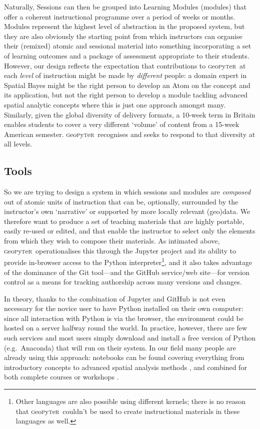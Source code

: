 \documentclass[letter, 11pt,titlepage]{article}
\newcommand{\gp}{\textsc{g}eo\textsc{p}y\textsc{t}e\textsc{r}~\/}
\newcommand{\eg}{e.g.~\/}
\begin{document}
Naturally, Sessions can then be grouped into Learning Modules (modules) that offer a coherent instructional programme over a period of weeks or months. Modules represent the highest level of abstraction in the proposed system, but they are also obviously the starting point from which instructors can organise their (remixed) atomic and sessional material into something incorporating a set of learning outcomes and a package of assessment appropriate to their students. However, our design reflects the expectation that contributions to \gp at each \emph{level} of instruction might be made by \emph{different} people: a domain expert in Spatial Bayes might be the right person to develop an Atom on the concept and its application, but not the right person to develop a module tackling advanced spatial analytic concepts where this is just one approach amongst many. Similarly, given the global diversity of delivery formats, a 10-week term in Britain enables students to cover a very different `volume' of
content from a 15-week American semester. \gp recognises and seeks to respond to
that diversity at all levels.

\subsection{Tools}\label{tools}

So we are trying to design a system in which sessions and modules are
\emph{composed} out of atomic units of instruction that can be, optionally,
surrounded by the instructor's own `narrative' or supported by more locally
relevant (geo)data. We therefore want to produce a set of teaching materials
that are highly portable, easily re-used or edited, and that enable the
instructor to select only the elements from which they wish to compose their
materials. As intimated above, \gp operationalises this through the Jupyter
project and its ability to provide in-browser access to the Python
interpreter\footnote{Other languages are also possible using different kernels;
there is no reason that \gp couldn't be used to create instructional materials
in these languages as well.}, and it also takes advantage of the dominance of
the Git tool---and the GitHub service/web site---for version control as a means for tracking authorship across many versions and changes.

In theory, thanks to the combination of Jupyter and GitHub is not even necessary
for the novice user to have Python installed on their own computer: since all
interaction with Python is via the browser, the environment could be hosted on a
server halfway round the world. In practice, however, there are few such
services and most users simply download and install a free version of Python
(\eg Anaconda) that will run on their system. In our field many people are
already using this approach: notebooks can be found covering everything from
introductory concepts \citep{millington_reades_2017_code} to advanced spatial
analysis methods \citep{darribas_gds15}, and combined for both complete courses
or workshops \citep{rey_2016_narsc}.
\end{document}
